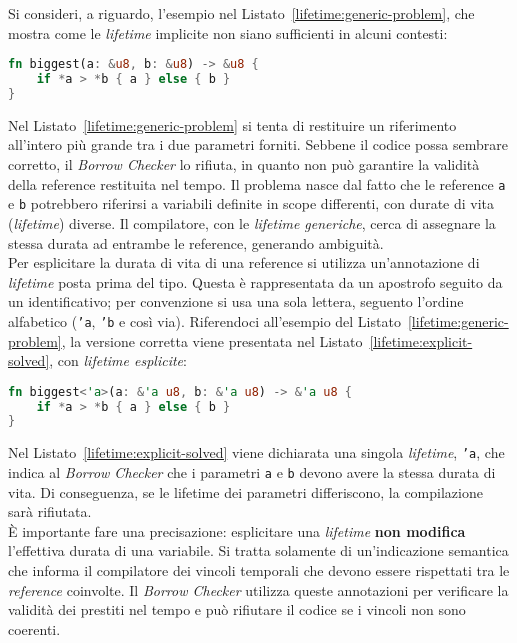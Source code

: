 Si consideri, a riguardo, l'esempio nel Listato~\ref{lifetime:generic-problem}, che mostra come le \textit{lifetime} implicite non siano sufficienti in alcuni contesti:
\begin{lstlisting}[language=Rust, caption={Limitazione delle \textit{lifetime} generiche}, label={lifetime:generic-problem}]
fn biggest(a: &u8, b: &u8) -> &u8 {
    if *a > *b { a } else { b }
}
\end{lstlisting}
Nel Listato~\ref{lifetime:generic-problem} si tenta di restituire un riferimento all'intero più grande tra i due parametri forniti. 
Sebbene il codice possa sembrare corretto, il \textit{Borrow Checker} lo rifiuta, in quanto non può garantire la validità della reference restituita nel tempo.
Il problema nasce dal fatto che le reference \texttt{a} e \texttt{b} potrebbero riferirsi a variabili definite in scope differenti, con durate di vita (\textit{lifetime}) diverse.
Il compilatore, con le \textit{lifetime generiche}, cerca di assegnare la stessa durata ad entrambe le reference, generando ambiguità. \hfill
\vspace{5pt}\\
\noindent Per esplicitare la durata di vita di una reference si utilizza un'annotazione di \textit{lifetime} posta prima del tipo. Questa è rappresentata da un apostrofo seguito da un identificativo; per convenzione si usa una sola lettera, seguento l'ordine alfabetico (\texttt{'a}, \texttt{'b} e così via).
Riferendoci all'esempio del Listato~\ref{lifetime:generic-problem}, la versione corretta viene presentata nel Listato~\ref{lifetime:explicit-solved}, con \textit{lifetime esplicite}:
\begin{lstlisting}[language=Rust, caption={\textit{Lifetime} esplicite}, label={lifetime:explicit-solved}]
fn biggest<'a>(a: &'a u8, b: &'a u8) -> &'a u8 {
    if *a > *b { a } else { b }
}
\end{lstlisting}
Nel Listato~\ref{lifetime:explicit-solved} viene dichiarata una singola \textit{lifetime}, \texttt{'a}, che indica al \textit{Borrow Checker} che i parametri \texttt{a} e \texttt{b} devono avere la stessa durata di vita. Di conseguenza, se le lifetime dei parametri differiscono, la compilazione sarà rifiutata. \hfill
\vspace{10pt}\\
\noindent È importante fare una precisazione: esplicitare una \textit{lifetime} \textbf{non modifica} l'effettiva durata di una variabile. Si tratta solamente di un'indicazione semantica che informa il compilatore dei vincoli temporali che devono essere rispettati tra le \textit{reference} coinvolte. Il \textit{Borrow Checker} utilizza queste annotazioni per verificare la validità dei prestiti nel tempo e può rifiutare il codice se i vincoli non sono coerenti.

